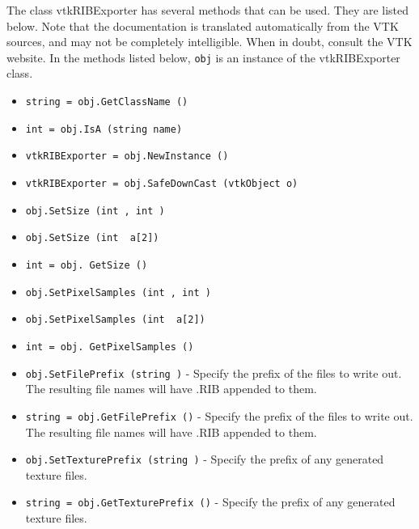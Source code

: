 The class vtkRIBExporter has several methods that can be used.
  They are listed below.
Note that the documentation is translated automatically from the VTK sources,
and may not be completely intelligible.  When in doubt, consult the VTK website.
In the methods listed below, \verb|obj| is an instance of the vtkRIBExporter class.
\begin{itemize}
\item  \verb|string = obj.GetClassName ()|

\item  \verb|int = obj.IsA (string name)|

\item  \verb|vtkRIBExporter = obj.NewInstance ()|

\item  \verb|vtkRIBExporter = obj.SafeDownCast (vtkObject o)|

\item  \verb|obj.SetSize (int , int )|

\item  \verb|obj.SetSize (int  a[2])|

\item  \verb|int = obj. GetSize ()|

\item  \verb|obj.SetPixelSamples (int , int )|

\item  \verb|obj.SetPixelSamples (int  a[2])|

\item  \verb|int = obj. GetPixelSamples ()|

\item  \verb|obj.SetFilePrefix (string )| -  Specify the prefix of the files to write out. The resulting file names
 will have .RIB appended to them.

\item  \verb|string = obj.GetFilePrefix ()| -  Specify the prefix of the files to write out. The resulting file names
 will have .RIB appended to them.

\item  \verb|obj.SetTexturePrefix (string )| -  Specify the prefix of any generated texture files.

\item  \verb|string = obj.GetTexturePrefix ()| -  Specify the prefix of any generated texture files.


\end{itemize}

